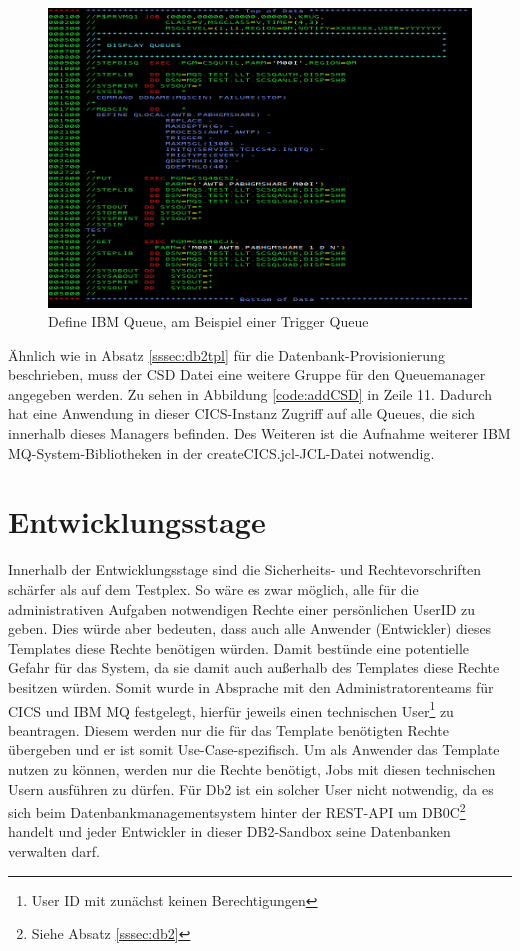 \begin{figure}[h]
	\centering
	\includegraphics[width=\textwidth]{figures/defqjcl.PNG}
	\caption{Define IBM Queue, am Beispiel einer Trigger Queue}
	\label{code:defq}
\end{figure}

Ähnlich wie in Absatz \ref{sssec:db2tpl} für die Datenbank-Provisionierung beschrieben, muss der CSD Datei eine weitere Gruppe für den Queuemanager angegeben werden.
Zu sehen in Abbildung \ref{code:addCSD} in Zeile 11.
Dadurch hat eine Anwendung in dieser CICS-Instanz Zugriff auf alle Queues, die sich innerhalb dieses Managers befinden.
Des Weiteren ist die Aufnahme weiterer IBM MQ-System-Bibliotheken in der \glqq createCICS.jcl\grqq-JCL-Datei notwendig.

\section{Entwicklungsstage}
Innerhalb der Entwicklungsstage sind die Sicherheits- und Rechtevorschriften schärfer als auf dem Testplex.
So wäre es zwar möglich, alle für die administrativen Aufgaben notwendigen Rechte einer persönlichen UserID zu geben.
Dies würde aber bedeuten, dass auch alle Anwender (Entwickler) dieses Templates diese Rechte benötigen würden.
Damit bestünde eine potentielle Gefahr für das System, da sie damit auch außerhalb des Templates diese Rechte besitzen würden.
Somit wurde in Absprache mit den Administratorenteams für CICS und IBM MQ festgelegt, hierfür jeweils einen technischen User\footnote{User ID mit zunächst keinen Berechtigungen} zu beantragen.
Diesem werden nur die für das Template benötigten Rechte übergeben und er ist somit Use-Case-spezifisch.
Um als Anwender das Template nutzen zu können, werden nur die Rechte benötigt, Jobs mit diesen technischen Usern ausführen zu dürfen.
Für Db2 ist ein solcher User nicht notwendig, da es sich beim Datenbankmanagementsystem hinter der REST-API um DB0C\footnote{Siehe Absatz \ref{sssec:db2}} handelt und jeder Entwickler in dieser \glqq DB2-Sandbox\grqq{} seine Datenbanken verwalten darf. 

